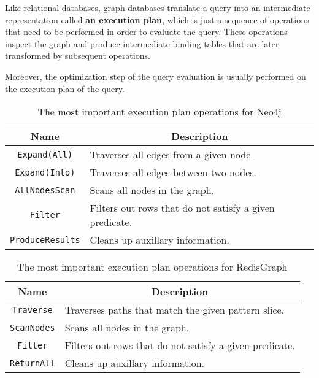 \documentclass[14pt]{constructor-thesis}
\theoremstyle{definition}
\begin{document}
Like relational databases, graph databases translate a query into an intermediate representation called \textbf{an execution plan}, which is just a sequence of operations that need to be performed in order to evaluate the query. These operations inspect the graph and produce intermediate binding tables that are later transformed by subsequent operations.

Moreover, the optimization step of the query evaluation is usually performed on the execution plan of the query.

\begin{table}[t]
  \centering
  
  \begin{center}
    \begin{tabular}{ |c|l|  }
      \hline
      Name & \multicolumn{1}{c|}{Description} \\
      \hline
      \texttt{Expand(All)} & Traverses all edges from a given node. \\
      \texttt{Expand(Into)} & Traverses all edges between two nodes. \\
      \texttt{AllNodesScan} & Scans all nodes in the graph. \\
      \texttt{Filter} & Filters out rows that do not satisfy a given predicate. \\
      \texttt{ProduceResults} & Cleans up auxillary information. \\
      \hline
    \end{tabular}
    \caption{The most important execution plan operations for Neo4j}
  \end{center}
  \label{tab:execution-plan-operations-summary-Neo4j}
\end{table}
\begin{table}[t]
  \begin{center}
    \begin{tabular}{ |c|l|  }
      \hline
      Name & \multicolumn{1}{c|}{Description} \\
      \hline
      \texttt{Traverse} & Traverses paths that match the given pattern slice. \\
      \texttt{ScanNodes} & Scans all nodes in the graph. \\
      \texttt{Filter} & Filters out rows that do not satisfy a given predicate. \\
      \texttt{ReturnAll} & Cleans up auxillary information. \\
      \hline
    \end{tabular}
    \caption{The most important execution plan operations for RedisGraph}
  \end{center}
  \label{tab:execution-plan-operations-summary-RedisGraph}
\end{table}
\end{document}
